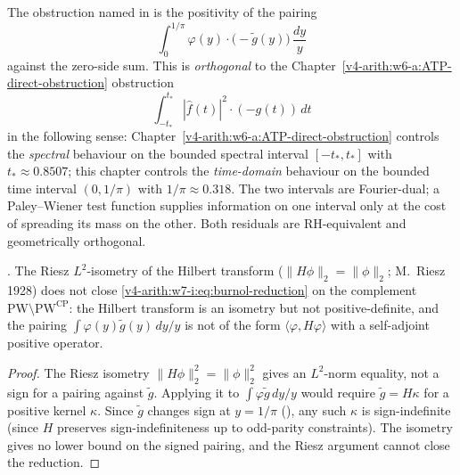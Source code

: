 \begin{remark}
\label{v4-arith:w7-i:rem:orthogonal-obstruction}
The obstruction named in  is
the positivity of the pairing
\begin{equation}
\int_{0}^{1/\pi}\varphi(y)\cdot\bigl(-\widetilde g(y)\bigr)\,\frac{dy}{y}
\end{equation}
against the zero-side sum. This is \emph{orthogonal} to the
Chapter~\ref{v4-arith:w6-a:ATP-direct-obstruction} obstruction
\begin{equation}
\int_{-t_{\ast}}^{t_{\ast}}|\widehat f(t)|^{2}\cdot(-g(t))\,dt
\end{equation}
in the following sense: Chapter~\ref{v4-arith:w6-a:ATP-direct-obstruction}
controls the \emph{spectral} behaviour on the bounded spectral
interval \([-t_{\ast},t_{\ast}]\) with \(t_{\ast}\approx 0.8507\); this
chapter controls the \emph{time-domain} behaviour on the bounded
time interval \((0,1/\pi)\) with \(1/\pi\approx 0.318\). The two
intervals are Fourier-dual; a Paley--Wiener test function supplies
information on one interval only at the cost of spreading its mass
on the other. Both residuals are RH-equivalent and geometrically
orthogonal.
\end{remark}

\begin{proposition}
\label{v4-arith:w7-i:prop:hilbert-rule-out}
\ClaimStatusProvedHere. The Riesz \(L^{2}\)-isometry of the
Hilbert transform (\(\|H\phi\|_{2}=\|\phi\|_{2}\); M.~Riesz 1928) does
not close \eqref{v4-arith:w7-i:eq:burnol-reduction} on the complement
\(\mathrm{PW}\setminus\mathrm{PW}^{\mathrm{CP}}\): the Hilbert
transform is an isometry but not positive-definite, and the pairing
\(\int\varphi(y)\widetilde g(y)\,dy/y\) is not of the form
\(\langle\varphi,H\varphi\rangle\) with a self-adjoint positive
operator.
\end{proposition}

\begin{proof}
The Riesz isometry \(\|H\phi\|_{2}^{2}=\|\phi\|_{2}^{2}\) gives an
\(L^{2}\)-norm equality, not a sign for a pairing against \(\widetilde g\).
Applying it to \(\int\varphi\widetilde g\,dy/y\) would require
\(\widetilde g=H\kappa\) for a positive kernel \(\kappa\). Since
\(\widetilde g\) changes sign at \(y=1/\pi\)
(), any such \(\kappa\) is
sign-indefinite (since \(H\) preserves sign-indefiniteness up to
odd-parity constraints). The isometry gives no lower bound on the
signed pairing, and the Riesz argument cannot close the reduction.
\end{proof}

